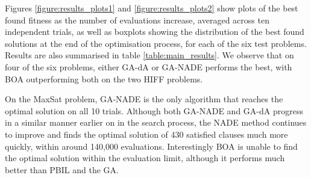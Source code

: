 \documentclass[twoside]{article}
\begin{document}
Figures \ref{figure:results_plots1} and \ref{figure:results_plots2} show plots of the best found fitness as the number of evaluations increase, averaged across ten independent trials, as well as boxplots showing the distribution of the best found solutions at the end of the optimisation process, for each of the six test problems. Results are also summarised in table \ref{table:main_results}. We observe that on four of the six problems, either GA-dA or GA-NADE performs the best, with BOA outperforming both on the two HIFF problems.

On the MaxSat problem, GA-NADE is the only algorithm that reaches the optimal solution on all 10 trials. Although both GA-NADE and GA-dA progress in a similar manner earlier on in the search process, the NADE method continues to improve and finds the optimal solution of 430 satisfied clauses much more quickly, within around 140,000 evaluations. Interestingly BOA is unable to find the optimal solution within the evaluation limit, although it performs much better than PBIL and the GA.
\end{document}
